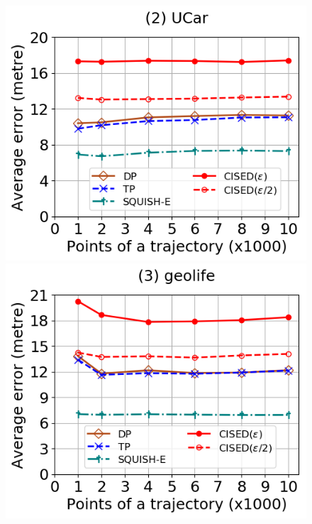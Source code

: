 \begin{figure}[tb!]
	\centering
	\includegraphics[scale=0.320]{Figures/Exp-query-SED-error-size-service.png} 	\hspace{3ex}
	\includegraphics[scale=0.320]{Figures/Exp-query-SED-error-size-geolife.png}	\hspace{3ex}

\end{figure}
